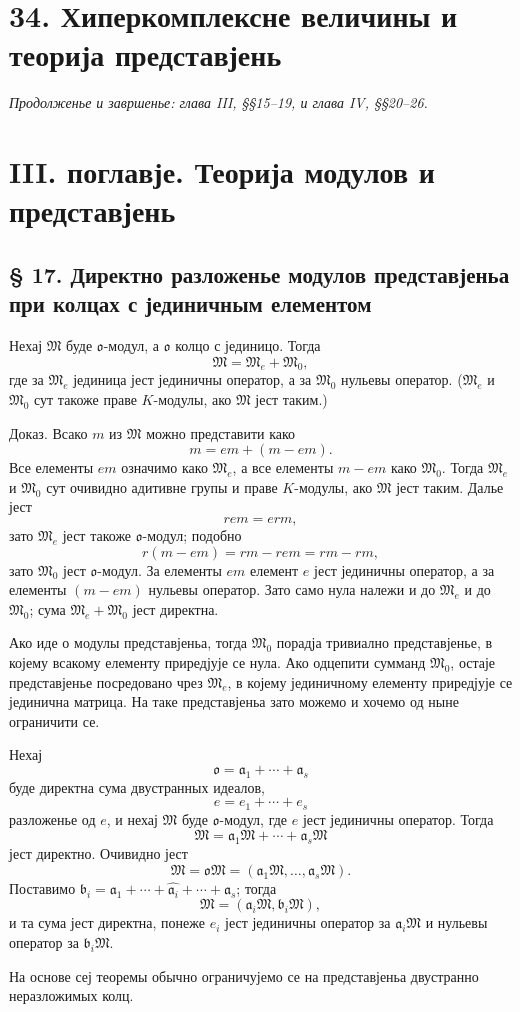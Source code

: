 ﻿\documentclass[11pt]{article}
\providecommand{\mo}{\mathfrak{o}}
\providecommand{\ma}{\mathfrak{a}}
\providecommand{\mb}{\mathfrak{b}}
\providecommand{\mM}{\mathfrak{M}}
\begin{document}
\section*{34. Хиперкомплексне величины и теорија представјень}
\emph{Продолженье и завршенье: глава III, §§15--19, и глава IV, §§20--26.}

\section*{III. поглавје. Теорија модулов и представјень}

\subsection*{§ 17. Директно разложенье модулов представјеньа при колцах с јединичным елементом}

Нехај $\mM$ буде $\mo$-модул, а $\mo$ колцо с јединицо. Тогда
\[
        \mM=\mM_e+\mM_0,
\]
где за $\mM_e$ јединица јест јединичны оператор, а за $\mM_0$ нульевы оператор. ($\mM_e$ и $\mM_0$ сут такоже праве $K$-модулы, ако $\mM$ јест таким.)

Доказ. Всако $m$ из $\mM$ можно представити како
\[
        m=em+(m-em).
\]
Все елементы $em$ означимо како $\mM_e$, а все елементы $m-em$ како $\mM_0$. Тогда $\mM_e$ и $\mM_0$ сут очивидно адитивне групы и праве $K$-модулы, ако $\mM$ јест таким. Далье јест
\[
        r em=erm,
\]
зато $\mM_e$ јест такоже $\mo$-модул; подобно
\[
        r(m-em)=rm-rem=rm-rm,
\]
зато $\mM_0$ јест $\mo$-модул. За елементы $em$ елемент $e$ јест јединичны оператор, а за елементы $(m-em)$ нульевы оператор. Зато само нула належи и до $\mM_e$ и до $\mM_0$; сума $\mM_e+\mM_0$ јест директна.

Ако иде о модулы представјеньа, тогда $\mM_0$ порадја тривиално представјенье, в којему всакому елементу приредјује се нула. Ако одцепити сумманд $\mM_0$, остаје представјенье посредовано чрез $\mM_e$, в којему јединичному елементу приредјује се јединична матрица. На таке представјеньа зато можемо и хочемо од ныне ограничити се.

Нехај
\[
        \mo=\ma_1+\cdots+\ma_s
\]
буде директна сума двустранных идеалов,
\[
        e=e_1+\cdots+e_s
\]
разложенье од $e$, и нехај $\mM$ буде $\mo$-модул, где $e$ јест јединичны оператор. Тогда
\[
        \mM=\ma_1\mM+\cdots+\ma_s\mM
\]
јест директно. Очивидно јест
\[
        \mM=\mo\mM=(\ma_1\mM,\ldots,\ma_s\mM).
\]
Поставимо $\mb_i=\ma_1+\cdots+\widehat{\ma_i}+\cdots+\ma_s$; тогда
\[
        \mM=(\ma_i\mM,\mb_i\mM),
\]
и та сума јест директна, понеже $e_i$ јест јединичны оператор за $\ma_i\mM$ и нульевы оператор за $\mb_i\mM$.

На основе сеј теоремы обычно ограничујемо се на представјеньа двустранно неразложимых колц.
\end{document}

